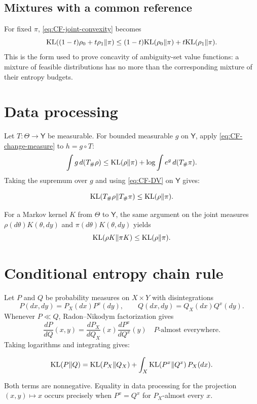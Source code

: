 \subsection{Mixtures with a common reference}
For fixed $\pi$, \eqref{eq:CF-joint-convexity} becomes
\begin{equation}\label{eq:CF-first-convexity}
 \mathrm{KL}((1-t)\rho_0+t\rho_1\|\pi)
 \le(1-t)\mathrm{KL}(\rho_0\|\pi)+t\mathrm{KL}(\rho_1\|\pi).
\end{equation}
This is the form used to prove concavity of ambiguity-set value functions: a mixture of
feasible distributions has no more than the corresponding mixture of their entropy
budgets.

\section{Data processing}
Let $T:\Theta\to\mathsf Y$ be measurable.  For bounded measurable $g$ on $\mathsf Y$,
apply \eqref{eq:CF-change-measure} to $h=g\circ T$:
\[
 \int g\,d(T_\#\rho)
 \le \mathrm{KL}(\rho\|\pi)+\log\int e^g\,d(T_\#\pi).
\]
Taking the supremum over $g$ and using \eqref{eq:CF-DV} on $\mathsf Y$ gives:

\begin{theorem}
\begin{equation}\label{eq:CF-DPI}
 \mathrm{KL}(T_\#\rho\|T_\#\pi)\le\mathrm{KL}(\rho\|\pi).
\end{equation}
\end{theorem}

For a Markov kernel $K$ from $\Theta$ to $\mathsf Y$, the same argument on the joint
measures $\rho(d\theta)K(\theta,dy)$ and $\pi(d\theta)K(\theta,dy)$ yields
\[
 \mathrm{KL}(\rho K\|\pi K)\le\mathrm{KL}(\rho\|\pi).
\]

\section{Conditional entropy chain rule}
Let $P$ and $Q$ be probability measures on $X\times Y$ with disintegrations
\[
 P(dx,dy)=P_X(dx)P^x(dy),
 \qquad
 Q(dx,dy)=Q_X(dx)Q^x(dy).
\]
Whenever $P\ll Q$, Radon--Nikodym factorization gives
\[
 \frac{dP}{dQ}(x,y)
 =\frac{dP_X}{dQ_X}(x)\frac{dP^x}{dQ^x}(y)
\quad P\text{-almost everywhere}.
\]
Taking logarithms and integrating gives:
\begin{theorem}
\begin{equation}\label{eq:CF-chain-rule}
 \mathrm{KL}(P\|Q)=\mathrm{KL}(P_X\|Q_X)
 +\int_X\mathrm{KL}(P^x\|Q^x)\,P_X(dx).
\end{equation}
\end{theorem}
Both terms are nonnegative.  Equality in data processing for the projection
$(x,y)\mapsto x$ occurs precisely when $P^x=Q^x$ for $P_X$-almost every $x$.

